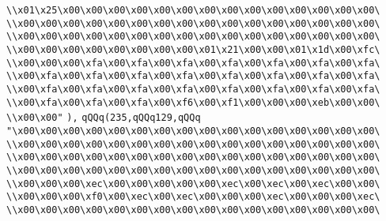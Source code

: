 \verb|\\x01\x25\x00\x00\x00\x00\x00\x00\x00\x00\x00\x00\x00\x00\x00\x00\|\newline
\verb|\\x00\x00\x00\x00\x00\x00\x00\x00\x00\x00\x00\x00\x00\x00\x00\x00\|\newline
\verb|\\x00\x00\x00\x00\x00\x00\x00\x00\x00\x00\x00\x00\x00\x00\x00\x00\|\newline
\verb|\\x00\x00\x00\x00\x00\x00\x00\x00\x01\x21\x00\x00\x01\x1d\x00\xfc\|\newline
\verb|\\x00\x00\x00\xfa\x00\xfa\x00\xfa\x00\xfa\x00\xfa\x00\xfa\x00\xfa\|\newline
\verb|\\x00\xfa\x00\xfa\x00\xfa\x00\xfa\x00\xfa\x00\xfa\x00\xfa\x00\xfa\|\newline
\verb|\\x00\xfa\x00\xfa\x00\xfa\x00\xfa\x00\xfa\x00\xfa\x00\xfa\x00\xfa\|\newline
\verb|\\x00\xfa\x00\xfa\x00\xfa\x00\xf6\x00\xf1\x00\x00\x00\xeb\x00\x00\|\newline
\verb|\\x00\x00"|\newline
\verb|),|\newline
\verb|qQQq(235,qQQq129,qQQq|\newline
\verb|"\x00\x00\x00\x00\x00\x00\x00\x00\x00\x00\x00\x00\x00\x00\x00\x00\|\newline
\verb|\\x00\x00\x00\x00\x00\x00\x00\x00\x00\x00\x00\x00\x00\x00\x00\x00\|\newline
\verb|\\x00\x00\x00\x00\x00\x00\x00\x00\x00\x00\x00\x00\x00\x00\x00\x00\|\newline
\verb|\\x00\x00\x00\x00\x00\x00\x00\x00\x00\x00\x00\x00\x00\x00\x00\x00\|\newline
\verb|\\x00\x00\x00\xec\x00\x00\x00\x00\x00\xec\x00\xec\x00\xec\x00\x00\|\newline
\verb|\\x00\x00\x00\xf0\x00\xec\x00\xec\x00\x00\x00\xec\x00\x00\x00\xec\|\newline
\verb|\\x00\x00\x00\x00\x00\x00\x00\x00\x00\x00\x00\x00\x00\x00\x00\x00\|\newline
